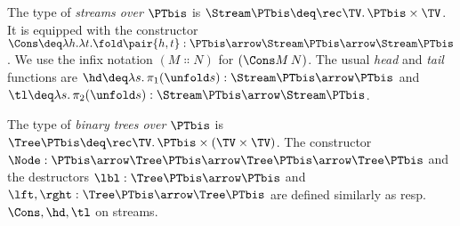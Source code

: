 \begin{example} %
\label{ex:pure}
The type of \emph{streams over $\PTbis$} is
$\Stream\PTbis \deq \rec\TV.\, \PTbis \times \TV$.
It is equipped with the constructor
\(
  \Cons
  \deq
  \lambda h .\lambda t.\fold \pair{h,t}
  :
  \PTbis \arrow \Stream\PTbis \arrow \Stream \PTbis
\).
We use the infix notation $(M \Colon N)$ for $(\Cons M\, N)$.
The usual \emph{head} and \emph{tail} functions
are $\hd \deq \lambda s.\, \pi_1 (\unfold s) : \Stream\PTbis \arrow \PTbis$
and $\tl \deq \lambda s.\, \pi_2 (\unfold s) : \Stream\PTbis \arrow \Stream\PTbis$.

The type of \emph{binary trees over $\PTbis$} is
$\Tree\PTbis \deq \rec\TV.\, \PTbis \times (\TV \times \TV)$.
The constructor
$\Node : \PTbis \arrow \Tree\PTbis \arrow \Tree\PTbis \arrow \Tree\PTbis$
and the destructors
$\lbl : \Tree\PTbis \arrow \PTbis$
and
$\lft, \rght : \Tree\PTbis \arrow \Tree\PTbis$
are defined similarly as resp.\ $\Cons, \hd, \tl$ on streams.
\end{example}

